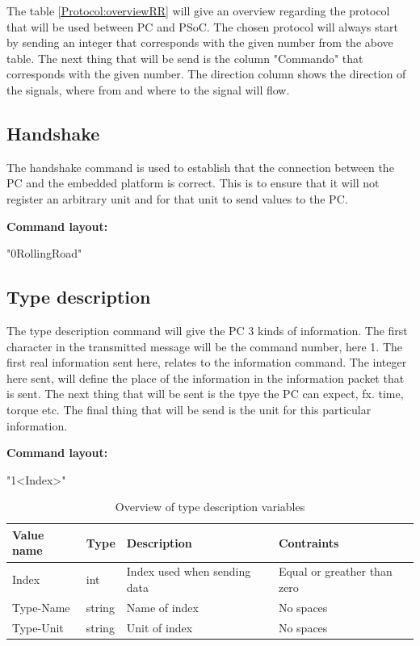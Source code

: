 
The table \ref{Protocol:overviewRR} will give an overview regarding the protocol that will be used between PC and PSoC. The chosen protocol will always start by sending an integer that corresponds with the given number from the above table.  The next thing that will be send is the column "Commando" that corresponds with the given number. The direction column shows the direction of the signals, where from and where to the signal will flow.

\subsection{Handshake}
The handshake command is used to establish that the connection between the PC and the embedded platform is correct. This is to ensure that it will not register an arbitrary unit and for that unit to send values to the PC.  

\textbf{Command layout:}

"0\textvisiblespace RollingRoad"

\subsection{Type description}
The type description command will give the PC 3 kinds of information. The first character in the transmitted message will be the command number, here 1. The first real information sent here, relates to the information command. The integer here sent, will define the place of the information in the information packet that is sent. The next thing that will be sent is the tpye the PC can expect, fx. time, torque etc. The final thing that will be send is the unit for this particular information.

\textbf{Command layout:}

"1\textvisiblespace <Index>"

\begin{table}[h!]
	\centering
	\label{Protocol:SP4RR_TypeDescVars}
	\begin{tabular}{llll}
		Value name 	& Type 		& Description 					& Contraints  					\\\hline
		Index  		& int   	& Index used when sending data 	& Equal or greather than zero	\\
		Type-Name  	& string 	& Name of index 				& No spaces						\\
		Type-Unit  	& string	& Unit of index					& No spaces 					\\
	\end{tabular}
	\caption{Overview of type description variables}
\end{table}

